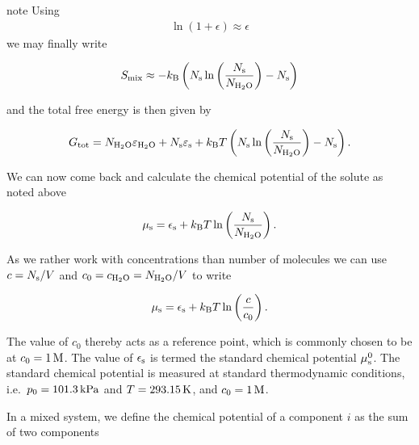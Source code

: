 \documentclass[letterpaper,10pt,english]{sphinxmanual}
\begin{document}
\begin{sphinxadmonition}{note}{}
\sphinxAtStartPar
Using
\begin{equation*}
\begin{split}\ln(1+\epsilon)\approx \epsilon\end{split}
\end{equation*}
\sphinxAtStartPar
we may finally write

\sphinxAtStartPar
\begin{equation}
S_{\rm mix}\approx -k_\mathrm{B} \left ( N_{\rm s} \ln \left ( \frac{N_{\rm s}}{N_{\rm H_2O}}\right) -N_{\rm s}\right )
\end{equation}

\sphinxAtStartPar
and the total free energy is then given by

\sphinxAtStartPar
\begin{equation}
G_{\rm tot}=N_{\rm{H_{2}O}}\varepsilon_{\rm H_{2}O}+N_{\rm s}\varepsilon_{\rm s}+k_\mathrm{B} T \left ( N_{\rm s} \ln \left ( \frac{N_{\rm s}}{N_{\rm H_2O}}\right) -N_{\rm s}\right ).
\end{equation}

\sphinxAtStartPar
We can now come back and calculate the chemical potential of the solute as noted above

\sphinxAtStartPar
\begin{equation}
\mu_{\rm s}=\epsilon_{\rm s}+k_{\rm B} T \ln \left ( \frac{N_{\rm s}}{N_{\rm H_2O}}\right ).
\end{equation}

\sphinxAtStartPar
As we rather work with concentrations than number of molecules we can use \(c=N_{\rm s}/V\) and \(c_0=c_{\rm H_2O}=N_{\rm H_2O}/V\) to write

\sphinxAtStartPar
\begin{equation}
\mu_{\rm s}=\epsilon_{\rm s}+k_{\rm B} T \ln \left ( \frac{c}{c_0}\right ).
\end{equation}

\sphinxAtStartPar
The value of \(c_0\) thereby acts as a reference point, which is commonly chosen to be at \(c_0=1\,{\rm M}\). The value of \(\epsilon_{\rm s}\) is termed the standard chemical potential \(\mu_{\rm s}^{0}\). The standard chemical potential is measured at standard thermodynamic conditions, i.e. \(p_0=101.3\, {\rm kPa}\) and \(T=293.15\, {\rm K}\), and \(c_0=1\, {\rm M}\).
\end{sphinxadmonition}

\sphinxAtStartPar
In a mixed system, we define the chemical potential of a component \(i\) as the sum of two components
\end{document}
